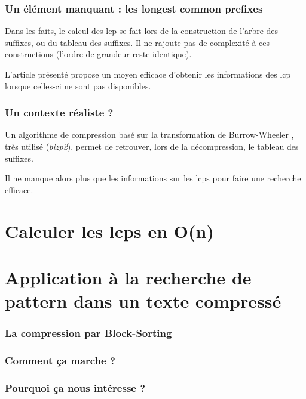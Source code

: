 \documentclass[10pt]{beamer}
\begin{document}
\begin{frame}
  \frametitle{Un élément manquant : les longest common prefixes}
  Dans les faits, le calcul des lcp se fait lors de la construction de
  l'arbre des suffixes, ou du tableau des suffixes. Il ne rajoute pas
  de complexité à ces constructions (l'ordre de grandeur reste
  identique).

  L'article présenté propose un moyen efficace d'obtenir
  les informations des lcp lorsque celles-ci ne sont pas
  disponibles\cite{Kasai01}.
\end{frame}


\begin{frame}
  \frametitle{Un contexte réaliste ?}
  Un algorithme de compression basé sur la transformation de
  Burrow-Wheeler \cite{Burrows94}, très utilisé (\emph{bizp2}), permet
  de retrouver, lors de la décompression, le tableau des suffixes. 

  Il ne manque alors plus que les informations sur les lcps pour faire
  une recherche efficace. 
\end{frame}

\section{Calculer les lcps en O(n)}
\label{sec:algo}



\section{Application à la recherche de pattern dans un texte compressé}
\label{sec:appcompress}

\begin{frame}
  \frametitle{La compression par Block-Sorting}
\end{frame}

\begin{frame}
  \frametitle{Comment ça marche ?}
\end{frame}

\begin{frame}
  \frametitle{Pourquoi ça nous intéresse ?}
\end{frame}
\end{document}
